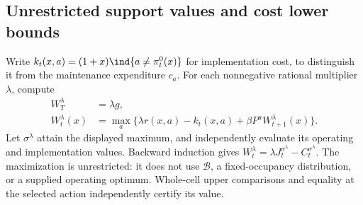 \subsection{Unrestricted support values and cost lower bounds}
Write $k_t(x,a)=(1+x)\ind\{a\ne\pi_t^0(x)\}$ for implementation cost, to distinguish it from the maintenance expenditure $c_a$. For each nonnegative rational multiplier $\lambda$, compute
\begin{equation}\label{eq:support}
\begin{split}
 W_T^\lambda&=\lambda g,\\
 W_t^\lambda(x)&=\max_a\{\lambda r(x,a)-k_t(x,a)
                 +\beta P^aW_{t+1}^\lambda(x)\}.
\end{split}
\end{equation}
Let $\sigma^\lambda$ attain the displayed maximum, and independently evaluate its operating and implementation values. Backward induction gives
$W_t^\lambda=\lambda J_t^{\sigma^\lambda}-C_t^{\sigma^\lambda}$.
The maximization is unrestricted: it does not use $\mathcal B$, a fixed-occupancy distribution, or a supplied operating optimum. Whole-cell upper comparisons and equality at the selected action independently certify its value.

